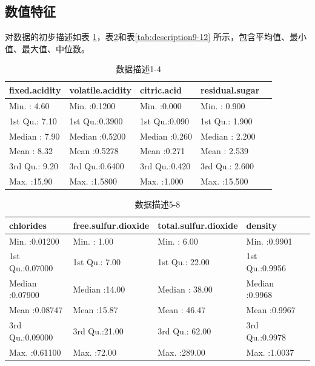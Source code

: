 \documentclass[fontset=ubuntu]{ctexart}
\begin{document}
        \subsection{数值特征}
        对数据的初步描述如表 \ref{tab:description1-4}，表\ref{tab:description5-8}和表\ref{tab:description9-12} 所示，包含平均值、最小值、最大值、中位数。
        \begin{table}[ht]
            \centering
            \caption{数据描述1-4}
            \vspace{5pt}
            \begin{tabular}{lllll}
                \hline
                fixed.acidity & volatile.acidity &  citric.acid & residual.sugar \\ 
                \hline
                Min.   : 4.60   & Min.   :0.1200   & Min.   :0.000   & Min.   : 0.900   \\ 
                1st Qu.: 7.10   & 1st Qu.:0.3900   & 1st Qu.:0.090   & 1st Qu.: 1.900   \\ 
                Median : 7.90   & Median :0.5200   & Median :0.260   & Median : 2.200   \\ 
                Mean   : 8.32   & Mean   :0.5278   & Mean   :0.271   & Mean   : 2.539   \\ 
                3rd Qu.: 9.20   & 3rd Qu.:0.6400   & 3rd Qu.:0.420   & 3rd Qu.: 2.600   \\ 
                Max.   :15.90   & Max.   :1.5800   & Max.   :1.000   & Max.   :15.500   \\ 
               \hline
            \end{tabular}
            \label{tab:description1-4}
        \end{table}

        \begin{table}[ht]
            \centering
            \caption{数据描述5-8}
            \vspace{5pt}
            \begin{tabular}{lllll}
                \hline
                chlorides & free.sulfur.dioxide & total.sulfur.dioxide &    density \\ 
                \hline
                Min.   :0.01200   & Min.   : 1.00   & Min.   :  6.00   & Min.   :0.9901   \\ 
                1st Qu.:0.07000   & 1st Qu.: 7.00   & 1st Qu.: 22.00   & 1st Qu.:0.9956   \\ 
                Median :0.07900   & Median :14.00   & Median : 38.00   & Median :0.9968   \\ 
                Mean   :0.08747   & Mean   :15.87   & Mean   : 46.47   & Mean   :0.9967   \\ 
                3rd Qu.:0.09000   & 3rd Qu.:21.00   & 3rd Qu.: 62.00   & 3rd Qu.:0.9978   \\ 
                Max.   :0.61100   & Max.   :72.00   & Max.   :289.00   & Max.   :1.0037   \\ 
                \hline
            \end{tabular}
            \label{tab:description5-8}
        \end{table}
\end{document}
